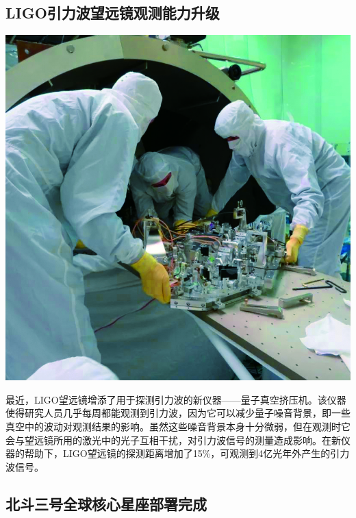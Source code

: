 \begin{multicols}{3}
\subsection*{LIGO引力波望远镜观测能力升级}

\noindent\includegraphics[width=\linewidth]{IMG/201912/111.jpg}

最近，LIGO望远镜增添了用于探测引力波的新仪器——量子真空挤压机。该仪器使得研究人员几乎每周都能观测到引力波，因为它可以减少量子噪音背景，即一些真空中的波动对观测结果的影响。虽然这些噪音背景本身十分微弱，但在观测时它会与望远镜所用的激光中的光子互相干扰，对引力波信号的测量造成影响。在新仪器的帮助下，LIGO望远镜的探测距离增加了15\%，可观测到4亿光年外产生的引力波信号。

\subsection*{北斗三号全球核心星座部署完成}


\end{multicols}
